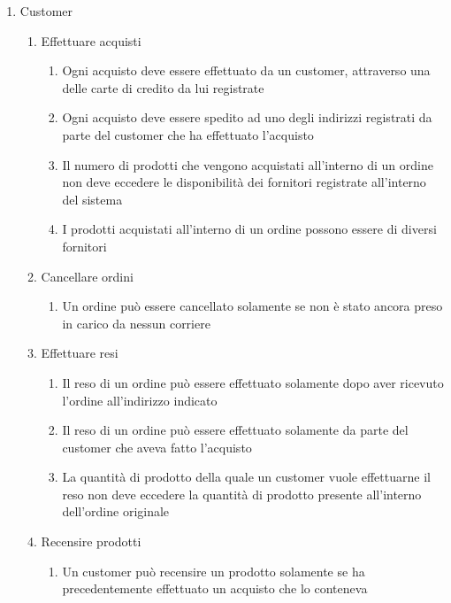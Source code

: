 \documentclass[12pt]{report}
\begin{document}
    \begin{enumerate}
        \item Customer
        \begin{enumerate}
            \item Effettuare acquisti
            \begin{enumerate}
                \item Ogni acquisto deve essere effettuato da un customer, attraverso una delle carte di credito da lui registrate
                \item Ogni acquisto deve essere spedito ad uno degli indirizzi registrati da parte del customer che ha effettuato l'acquisto
                \item Il numero di prodotti che vengono acquistati all'interno di un ordine non deve eccedere le disponibilità dei fornitori registrate all'interno del sistema
                \item I prodotti acquistati all'interno di un ordine possono essere di diversi fornitori
            \end{enumerate}
            \item Cancellare ordini
            \begin{enumerate}
                \item Un ordine può essere cancellato solamente se non è stato ancora preso in carico da nessun corriere
            \end{enumerate}
            \item Effettuare resi
            \begin{enumerate}
                \item Il reso di un ordine può essere effettuato solamente dopo aver ricevuto l'ordine all'indirizzo indicato
                \item Il reso di un ordine può essere effettuato solamente da parte del customer che aveva fatto l'acquisto
                \item La quantità di prodotto della quale un customer vuole effettuarne il reso non deve eccedere la quantità di prodotto presente all'interno dell'ordine originale
            \end{enumerate}
            \item Recensire prodotti
            \begin{enumerate}
                \item Un customer può recensire un prodotto solamente se ha precedentemente effettuato un acquisto che lo conteneva
            \end{enumerate}

\end{enumerate}
\end{enumerate}
\end{document}
